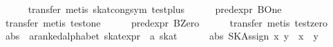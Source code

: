 \begin{isabellebody}
\ \ \ \ \isamarkupfalse%
\ {}transfer{}\ metis\ skat{}cong{}sym\ test{}plus{}\isanewline
\ \ \isamarkupfalse%
\ {}{}\ {}\ pred{}expr\ BOne{}\isanewline
\ \ \ \ \isamarkupfalse%
\ {}transfer{}\ metis\ test{}one{}\isanewline
\ \ \isamarkupfalse%
\ {}{}\ {}\ pred{}expr\ BZero{}\isanewline
\ \ \ \ \isamarkupfalse%
\ {}transfer{}\ metis\ test{}zero{}\isanewline
{}\isamarkupfalse%
%
\endisatagproof
{\isafoldproof}%
%
\isadelimproof
\isanewline
%
\endisadelimproof
\isanewline
{}\isamarkupfalse%
\ abs\ {}{}\ {}{}a{}{}ranked{}alphabet\ skat{}expr\ {}\ {}a\ skat{}\ {}{}{}{}{}{}\ {}{}{}{}{}\ {}{}{}{}\ \isanewline
\ \ {}abs\ {}SKAssign\ x\ y{}\ {}\ x\ {}{}\ y{}\isanewline

\end{isabellebody}
